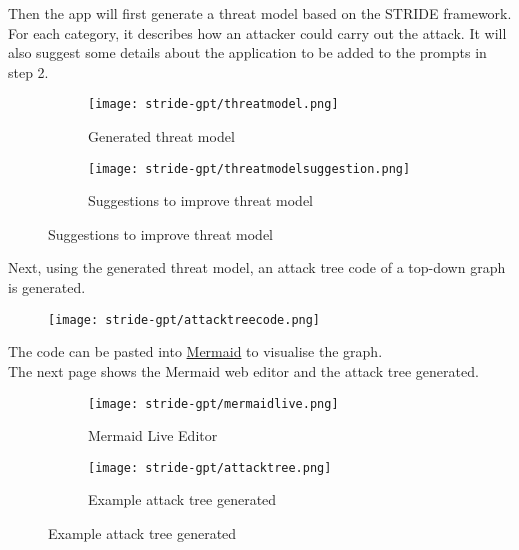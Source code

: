 Then the app will first generate a threat model based on the STRIDE framework. For each category, it describes how an attacker could carry out the attack. It will also suggest some details about the application to be added to the prompts in step 2.
\begin{figure}[htbp]
    \centering
    \begin{subfigure}[b]{1\textwidth}
        \centering
        \texttt{[image: stride-gpt/threatmodel.png]}
        \caption{Generated threat model}
    \end{subfigure}
    \par\bigskip
    \begin{subfigure}[b]{1\textwidth}
        \centering
        \texttt{[image: stride-gpt/threatmodelsuggestion.png]}
        \caption{Suggestions to improve threat model}
    \end{subfigure}
\end{figure}

Next, using the generated threat model, an attack tree code of a top-down graph is generated.
\begin{figure}[htbp]
    \centering
    \texttt{[image: stride-gpt/attacktreecode.png]}
\end{figure}

The code can be pasted into \href{https://mermaid.live/edit#pako:eNpllMGO2jAQhl9llBNIu5ceOVRKCOxG2qiUsO2h9DA4Q-LdYEe2Q0tX--4d2xRolgNC-J9_Zj7P-C0RuqZkljQG-xY2-VYBf9If2-Q77SDt-04KdFIr2LSG0EHJ-m6b_IT7-8-Qsa7qtd5L1UBRk3LSnfjw7BI0c9Zs8NCT8aJf0rWQo8ORKmfVmvqhliHb6HTBp4Xaa3OIteTSik7bwdBIuGRhTkpiB3oPFZmjFGPNA2sWHR2jFctWRh5lR00URmkW-_MgymUK2alHay9G51Pf_pd0cO0n2OhXUvAoX1C8cp9jpYcwNxQIcW2VG_aB2SRDKwV4jymMgzyTiqz1Zf7vHGXzyNfX6InClfJRIlRfn6BQLyRCm5PyxH_c5DgHZx-DZeDrTLEbHNWQZzCZc_OoaoMfDXxnS6YHz32nsYZvQ6fI4E52PAowWT2upjcl5_GyQ8nS4o7jUr5zB0-6ueI9q3xti99sy-eFsh6ZkEzQi5tbyPF7EUclDdSUlU4eKYwasEkYlsBlYYw2UDJXbOia8xztc5aoPATXEpSyrrnGSVlsyimkzvElgB9Ab8uajUGfaezioTwr5FvVRv5hiOmqgFQITgqTNaFwdzAis4zzG8jkuvJJeAPZm7OPVnF6SXcOCpfIMb69NVk9GEHcdIuDjZefZ7epHuIa-FSX0YeFFdjFlXCt0UPTwlpz6wxD9kP3byuTu-RAvIay5kfjzfttEwZ14N2Z8c-a9jh0zGOr3lnKBHR1UiKZOTPQXTL0NTrKJfJzc0hme-ws_0s8ANqU8SEK79H7XxTQbec}{Mermaid} to visualise the graph. \\
The next page shows the Mermaid web editor and the attack tree generated.
\begin{figure}[htbp]
    \centering
    \begin{subfigure}[b]{1\textwidth}
        \centering
        \texttt{[image: stride-gpt/mermaidlive.png]}
        \caption{Mermaid Live Editor}
    \end{subfigure}
    \par\bigskip
    \begin{subfigure}[b]{1\textwidth}
        \centering
        \texttt{[image: stride-gpt/attacktree.png]}
        \caption{Example attack tree generated}
    \end{subfigure}
\end{figure}
\clearpage

